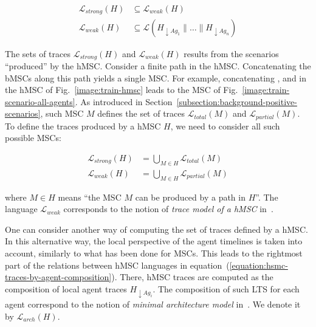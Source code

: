 \vspace{-0.5cm}
\begin{align}
\mathcal{L}_{strong}(H) & \subseteq \mathcal{L}_{weak}(H) \\
\mathcal{L}_{weak}(H) & \subseteq \mathcal{L}(H_{\downarrow Ag_1} \parallel \ldots \parallel H_{\downarrow Ag_n})
\label{equation:hsmc-traces-by-agent-composition}
\end{align}

The sets of traces $\mathcal{L}_{strong}(H)$ and $\mathcal{L}_{weak}(H)$ results from the scenarios ``produced'' by the hMSC. Consider a finite path in the hMSC. Concatenating the bMSCs along this path yields a single MSC. For example, concatenating ,  and  in the hMSC of Fig.~\ref{image:train-hmsc} leads to the MSC of Fig.~\ref{image:train-scenario-all-agents}. As introduced in Section~\ref{subsection:background-positive-scenarios}, such MSC $M$ defines the set of traces $\mathcal{L}_{total}(M)$ and $\mathcal{L}_{partial}(M)$. To define the traces produced by a hMSC $H$, we need to consider all such possible MSCs: 

\vspace{-0.5cm}
\begin{align*}
\mathcal{L}_{strong}(H) &= \bigcup_{M \in H} \mathcal{L}_{total}(M) \\
\mathcal{L}_{weak}(H) &= \bigcup_{M \in H} \mathcal{L}_{partial}(M)
\end{align*}

\noindent where $M \in H$ means ``the MSC $M$ can be produced by a path in $H$''. The language $\mathcal{L}_{weak}$ corresponds to the notion of \emph{trace model of a hMSC} in~\cite{Uchitel:2004}.

One can consider another way of computing the set of traces defined by a hMSC. In this alternative way, the local perspective of the agent timelines is taken into account, similarly to what has been done for MSCs. This leads to the rightmost part of the relations between hMSC languages in equation~(\ref{equation:hsmc-traces-by-agent-composition}). There, hMSC traces are computed as the composition of local agent traces $H_{\downarrow Ag_i}$. The composition of such LTS for each agent correspond to the notion of \emph{minimal architecture model} in~\cite{Uchitel:2004}. We denote it by $\mathcal{L}_{arch}(H)$.


